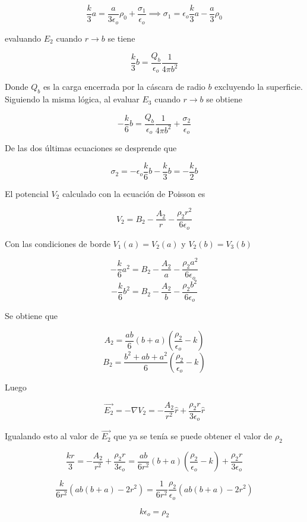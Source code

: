 \[\frac{k}{3}a = \frac{a}{3\epsilon_o}\rho_0 +
\frac{\sigma_1}{\epsilon_o} \implies \sigma_1 = \epsilon_o\frac{k}{3}a - \frac{a}{3}\rho_0\]

evaluando $E_2$ cuando $r\rightarrow b$ se tiene

\[\frac{k}{3}b = \frac{Q_b}{\epsilon_o}\frac{1}{4\pi b^2}\]

Donde $Q_b$ es la carga encerrada por la cáscara de radio $b$ excluyendo la superficie. Siguiendo la misma lógica, al evaluar $E_3$ cuando $r\rightarrow b$ se obtiene

\[-\frac{k}{6}b = \frac{Q_b}{\epsilon_o}\frac{1}{4\pi b^2}
+ \frac{\sigma_2}{\epsilon_o}\]

De las dos últimas ecuaciones se desprende que

\[\sigma_2 = -\epsilon_o\frac{k}{6}b-\frac{k}{3}b = -\frac{k}{2}b\]

El potencial $V_2$ calculado con la ecuación de Poisson es

\[V_2 = B_2-\frac{A_2}{r}-\frac{\rho_2 r^2}{6\epsilon_o}\]

Con las condiciones de borde $V_1(a) = V_2(a)$ y $V_2(b) = V_3(b)$

\[-\frac{k}{6}a^2 = B_2-\frac{A_2}{a}-\frac{\rho_2 a^2}{6\epsilon_o}\]
\[-\frac{k}{6}b^2 = B_2-\frac{A_2}{b}-\frac{\rho_2 b^2}{6\epsilon_o}\]

Se obtiene que

\[A_2=\frac{ab}{6}(b+a)\left(\frac{\rho_2}{\epsilon_o}-k\right)\]
\[B_2=\frac{b^2+ab+a^2}{6}
\left(\frac{\rho_2}{\epsilon_o}-k\right)\]

Luego

\[\Vec{E_2} = -\nabla V_2 =
-\frac{A_2}{r^2}\hat{r}+\frac{\rho_2 r}{3\epsilon_o}\hat{r}\]

Igualando esto al valor de $\Vec{E_2}$ que ya se tenía se puede obtener el valor de $\rho_2$

\[\frac{kr}{3} =
-\frac{A_2}{r^2}+\frac{\rho_2 r}{3\epsilon_o}
= \frac{ab}{6r^2}(b+a)\left(\frac{\rho_2}{\epsilon_o}-k\right)
+\frac{\rho_2 r}{3\epsilon_o}\]

\[\frac{k}{6r^2}(ab(b+a)-2r^2) = \frac{1}{6r^2}\frac{\rho_2}{\epsilon_o}(ab(b+a)-2r^2)\]

\[k\epsilon_o = \rho_2\]



